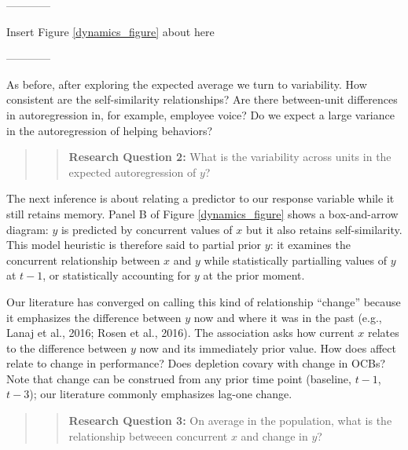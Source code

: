 \documentclass[english,,man]{apa6}
\theoremstyle{definition}
\theoremstyle{definition}
\theoremstyle{definition}
\theoremstyle{remark}
\begin{document}
\begin{center}

------------

Insert Figure \ref{dynamics_figure} about here

------------

\end{center}

As before, after exploring the expected average we turn to variability.
How consistent are the self-similarity relationships? Are there
between-unit differences in autoregression in, for example, employee
voice? Do we expect a large variance in the autoregression of helping
behaviors?

\begin{quote}
\begin{quote}
\textbf{Research Question 2:} What is the variability across units in
the expected autoregression of \(y\)?
\end{quote}
\end{quote}

The next inference is about relating a predictor to our response
variable while it still retains memory. Panel B of Figure
\ref{dynamics_figure} shows a box-and-arrow diagram: \(y\) is predicted
by concurrent values of \(x\) but it also retains self-similarity. This
model heuristic is therefore said to partial prior \(y\): it examines
the concurrent relationship between \(x\) and \(y\) while statistically
partialling values of \(y\) at \(t - 1\), or statistically accounting
for \(y\) at the prior moment.

Our literature has converged on calling this kind of relationship
\enquote{change} because it emphasizes the difference between \(y\) now
and where it was in the past (e.g., Lanaj et al., 2016; Rosen et al.,
2016). The association asks how current \(x\) relates to the difference
between \(y\) now and its immediately prior value. How does affect
relate to change in performance? Does depletion covary with change in
OCBs? Note that change can be construed from any prior time point
(baseline, \(t-1\), \(t-3\)); our literature commonly emphasizes lag-one
change.

\begin{quote}
\begin{quote}
\textbf{Research Question 3:} On average in the population, what is the
relationship betweeen concurrent \(x\) and change in \(y\)?
\end{quote}
\end{quote}
\end{document}
